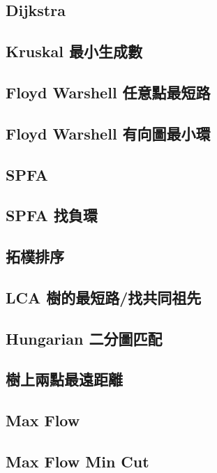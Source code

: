 \subsection{Dijkstra}

\subsection{Kruskal 最小生成數}

\subsection{Floyd Warshell 任意點最短路}

\subsection{Floyd Warshell 有向圖最小環}

\subsection{SPFA}

\subsection{SPFA 找負環}

\subsection{拓樸排序}

\subsection{LCA 樹的最短路/找共同祖先}

\subsection{Hungarian 二分圖匹配}

\subsection{樹上兩點最遠距離}

\subsection{Max Flow}

\subsection{Max Flow Min Cut}


